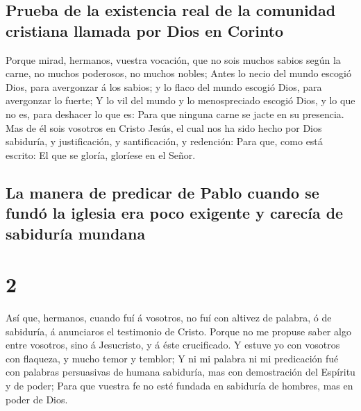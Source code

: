 \hypertarget{prueba-de-la-existencia-real-de-la-comunidad-cristiana-llamada-por-dios-en-corinto}{%
\subsection{Prueba de la existencia real de la comunidad cristiana
llamada por Dios en
Corinto}\label{prueba-de-la-existencia-real-de-la-comunidad-cristiana-llamada-por-dios-en-corinto}}

 Porque mirad, hermanos, vuestra vocación, que no sois
muchos sabios según la carne, no muchos poderosos, no muchos nobles;
 Antes lo necio del mundo escogió Dios, para avergonzar á
los sabios; y lo flaco del mundo escogió Dios, para avergonzar lo
fuerte;  Y lo vil del mundo y lo menospreciado escogió
Dios, y lo que no es, para deshacer lo que es:  Para que
ninguna carne se jacte en su presencia.  Mas de él sois
vosotros en Cristo Jesús, el cual nos ha sido hecho por Dios sabiduría,
y justificación, y santificación, y redención:  Para que,
como está escrito: El que se gloría, gloríese en el Señor.

\hypertarget{la-manera-de-predicar-de-pablo-cuando-se-funduxf3-la-iglesia-era-poco-exigente-y-carecuxeda-de-sabiduruxeda-mundana}{%
\subsection{La manera de predicar de Pablo cuando se fundó la iglesia
era poco exigente y carecía de sabiduría
mundana}\label{la-manera-de-predicar-de-pablo-cuando-se-funduxf3-la-iglesia-era-poco-exigente-y-carecuxeda-de-sabiduruxeda-mundana}}

\hypertarget{section-46-2}{%
\section{2}\label{section-46-2}}

 Así que, hermanos, cuando fuí á vosotros, no fuí con
altivez de palabra, ó de sabiduría, á anunciaros el testimonio de
Cristo.  Porque no me propuse saber algo entre vosotros,
sino á Jesucristo, y á éste crucificado.  Y estuve yo con
vosotros con flaqueza, y mucho temor y temblor;  Y ni mi
palabra ni mi predicación fué con palabras persuasivas de humana
sabiduría, mas con demostración del Espíritu y de poder; 
Para que vuestra fe no esté fundada en sabiduría de hombres, mas en
poder de Dios.

